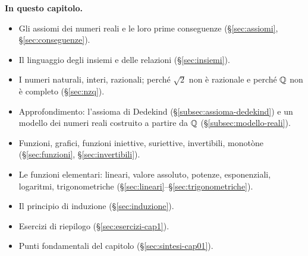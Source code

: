\medskip
\noindent\textbf{In questo capitolo.}
\begin{itemize}
  \item Gli assiomi dei numeri reali e le loro prime conseguenze (\S\ref{sec:assiomi},
  \S\ref{sec:conseguenze}).
  \item Il linguaggio degli insiemi e delle relazioni (\S\ref{sec:insiemi}).
  \item I numeri naturali, interi, razionali; perché $\sqrt2$ non è razionale e perché
  $\mathbb{Q}$ non è completo (\S\ref{sec:nzq}).
  \item Approfondimento: l'assioma di Dedekind (\S\ref{subsec:assioma-dedekind}) e un
  modello dei numeri reali costruito a partire da $\mathbb{Q}$ (\S\ref{subsec:modello-reali}).
  \item Funzioni, grafici, funzioni iniettive, suriettive, invertibili, monotòne
  (\S\ref{sec:funzioni}, \S\ref{sec:invertibili}).
  \item Le funzioni elementari: lineari, valore assoluto, potenze, esponenziali,
  logaritmi, trigonometriche (\S\ref{sec:lineari}--\S\ref{sec:trigonometriche}).
  \item Il principio di induzione (\S\ref{sec:induzione}).
  \item Esercizi di riepilogo (\S\ref{sec:esercizi-cap1}).
  \item Punti fondamentali del capitolo (\S\ref{sec:sintesi-cap01}).
\end{itemize}













